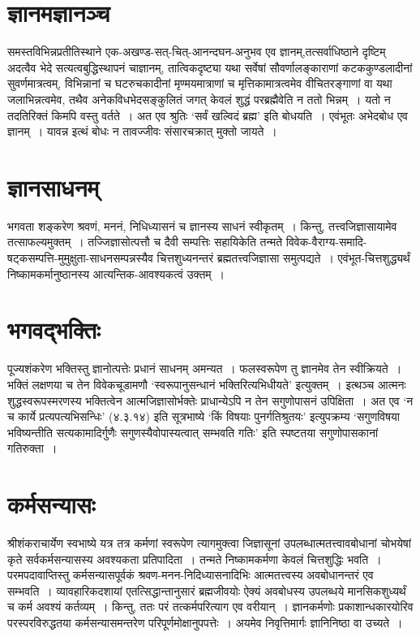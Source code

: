 {\section*{ज्ञानमज्ञानञ्च}

समस्तविभिन्नप्रतीतिस्थाने एक-अखण्ड-सत्-चित्-आनन्दघन-अनुभव एव ज्ञानम्,\break तत्सर्वाधिष्ठाने दृष्टिम् अदत्वैव भेदे सत्यत्वबुद्धिस्थापनं चाज्ञानम्, तात्विकदृष्ट्या यथा सर्वेषां सौवर्णालङ्काराणां कटककुण्डलादीनां सुवर्णमात्रत्वम्, विभिन्नानां च घटरुचकादीनां मृण्मयमात्राणां च मृत्तिकामात्रत्वमेव वीचितरङ्गाणां वा यथा जलाभिन्नत्वमेव, तथैव अनेकविध\-भेदसङ्कुलितं जगत् केवलं शुद्धं परब्रह्मैवेति न ततो भिन्नम्~। यतो न तदतिरिक्तं किमपि वस्तु वर्तते~। अत एव श्रुतिः ‘सर्वं खल्विदं ब्रह्म’ इति बोधयति~। एवंभूतः अभेदबोध एव ज्ञानम्~। यावन्न इत्थं बोधः न तावज्जीवः संसारचक्रात् मुक्तो जायते~। 

\section*{ज्ञानसाधनम्}

भगवता शङ्करेण श्रवणं, मननं, निधिध्यासनं च ज्ञानस्य साधनं स्वीकृतम्~। किन्तु, तत्त्वजिज्ञासायामेव तत्साफल्यमुक्तम्~। तज्जिज्ञासोत्पत्तौ च दैवी सम्पत्तिः सहायिकेति तन्मते विवेक-वैराग्य-समादि-षट्कसम्पत्ति-मुमुक्षुता-साधनसम्पन्नस्यैव चित्तशुध्यनन्तरं ब्रह्मतत्त्वजिज्ञासा समुत्पद्यते~। एवंभूत-चित्तशुद्ध्यर्थं निष्कामकर्मानुष्ठानस्य आत्यन्तिक-आवश्यकत्वं उक्तम्~। 
\newpage

\section*{भगवद्भक्तिः}

पूज्यशंकरेण भक्तिस्तु ज्ञानोत्पत्तेः प्रधानं साधनम् अमन्यत~। फलस्वरूपेण तु ज्ञानमेव तेन स्वीक्रियते~। भक्तिं लक्षणया च तेन विवेकचूडामणौ ‘स्वरूपानुसन्धानं भक्तिरित्यभिधीयते’ इत्युक्तम्~। इत्थञ्च आत्मनः शुद्धस्वरूपस्मरणस्य भक्तित्वेन आत्मजिज्ञासोर्भक्तेः प्राधान्येऽपि न तेन सगुणोपासनं उपिक्षिता~। अत एव ‘न च कार्ये प्रत्यपत्यभिसन्धिः’ (४.३.१४) इति सूत्रभाष्ये ‘किं विषयाः पुनर्गतिश्रुतयः’ इत्युपक्रम्य ‘सगुणविषया भविष्यन्तीति सत्यकामादिर्गुणैः सगुणस्यैवोपास्यत्वात् सम्भवति गतिः’ इति स्पष्टतया सगुणोपासकानां गतिरुक्ता~। 

\section*{कर्मसन्यासः}

श्रीशंकराचार्येण स्वभाष्ये यत्र तत्र कर्मणां स्वरूपेण त्यागमुक्त्वा जिज्ञासूनां उपलब्धात्मतत्त्वावबोधानां चोभयेषां कृते सर्वकर्मसन्यासस्य अवश्यकता प्रतिपादिता~। तन्मते निष्काम\-कर्मणा केवलं चित्तशुद्धिः भवति~। परमपदावाप्तिस्तु कर्मसन्यासपूर्वकं श्रवण-मनन-निदिध्या\-सनादिभिः आत्मतत्त्वस्य अवबोधानन्तरं एव सम्भवति~। व्यावहारिकदशायां एतत्सिद्धान्तानुसारं ब्रह्मजीवयोः ऐक्यं अवबोधस्य उपलब्धये मानसिकशुध्यर्थं च कर्म अवश्यं कर्तव्यम्~। किन्तु, ततः परं तत्कर्मपरित्याग एव वरीयान्~। ज्ञानकर्मणोः प्रकाशान्धकारयोरिव परस्परविरुद्धतया कर्मसन्यासमन्तरेण परिपूर्णमोक्षानुपपत्तेः~। अयमेव निवृत्तिमार्गः ज्ञानिनिष्ठा वा उच्यते~। 

}
